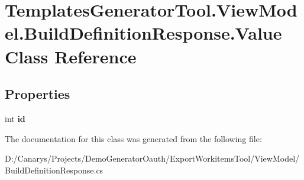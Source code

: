\hypertarget{class_templates_generator_tool_1_1_view_model_1_1_build_definition_response_1_1_value}{}\section{Templates\+Generator\+Tool.\+View\+Model.\+Build\+Definition\+Response.\+Value Class Reference}
\label{class_templates_generator_tool_1_1_view_model_1_1_build_definition_response_1_1_value}
\subsection*{Properties}
\begin{DoxyCompactItemize}
\item 
\mbox{\label{class_templates_generator_tool_1_1_view_model_1_1_build_definition_response_1_1_value_ab45c38c65781181e924995834c516d6d}} 
int {\bfseries id}
\end{DoxyCompactItemize}


The documentation for this class was generated from the following file\+:\begin{DoxyCompactItemize}
\item 
D\+:/\+Canarys/\+Projects/\+Demo\+Generator\+Oauth/\+Export\+Workitems\+Tool/\+View\+Model/Build\+Definition\+Response.\+cs\end{DoxyCompactItemize}
